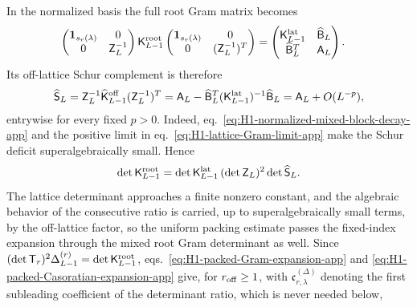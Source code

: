\documentclass[a4paper,11pt]{article}
\theoremstyle{definition}
\theoremstyle{remark}
\newcommand{\Id}{\mathbf 1}
\begin{document}
In the normalized basis the full root Gram matrix becomes
\begin{equation}
\begin{aligned}
   \begin{pmatrix}
      \Id_{s_r(\lambda)}&0\\
      0&\mathsf Z_L^{-1}
   \end{pmatrix}
   \mathsf K_{L-1}^{\rm root}
   \begin{pmatrix}
      \Id_{s_r(\lambda)}&0\\
      0&(\mathsf Z_L^{-1})^T
   \end{pmatrix}
   &=
   \begin{pmatrix}
      \mathsf K_{L-1}^{\rm lat}&\widehat{\mathsf B}_L\\
      \widehat{\mathsf B}_L^T&\mathsf A_L
   \end{pmatrix}.
\end{aligned}
   \label{eq:H1-mixed-normalized-Gram-app}
\end{equation}
Its off-lattice Schur complement is therefore
\begin{equation}
\begin{aligned}
   \widehat{\mathsf S}_L
   =
   \mathsf Z_L^{-1}
   \widehat{\mathsf K}_{L-1}^{\rm off}
   (\mathsf Z_L^{-1})^T 
   =\mathsf A_L
   -\widehat{\mathsf B}_L^T
   (\mathsf K_{L-1}^{\rm lat})^{-1}
   \widehat{\mathsf B}_L
   =\mathsf A_L+O(L^{-p}),
\end{aligned}
   \label{eq:H1-normalized-Schur-deficit-app}
\end{equation}
entrywise for every fixed \(p>0\). Indeed,
eq.~\eqref{eq:H1-normalized-mixed-block-decay-app} and the positive
limit in eq.~\eqref{eq:H1-lattice-Gram-limit-app} make the Schur
deficit superalgebraically small. Hence
\begin{equation}
   \det\mathsf K_{L-1}^{\rm root}
   =
   \det\mathsf K_{L-1}^{\rm lat}\,
   (\det\mathsf Z_L)^2
   \det\widehat{\mathsf S}_L.
\end{equation}
The lattice determinant approaches a finite nonzero constant, and the
algebraic behavior of the consecutive ratio is carried, up to
superalgebraically small terms, by the off-lattice factor, so the uniform packing estimate
passes the fixed-index expansion through the mixed root Gram determinant as well. Since
\((\det\mathsf T_r)^2\Delta_{L-1}^{(r)}
=\det\mathsf K_{L-1}^{\rm root}\),
eqs.~\eqref{eq:H1-packed-Gram-expansion-app} and
\eqref{eq:H1-packed-Casoratian-expansion-app} give, for
\(r_{\rm off}\ge1\), with
\(\mathfrak c_{r,\lambda}^{(\Delta)}\) denoting the first subleading coefficient of the determinant ratio, which is never needed below,
\end{document}
